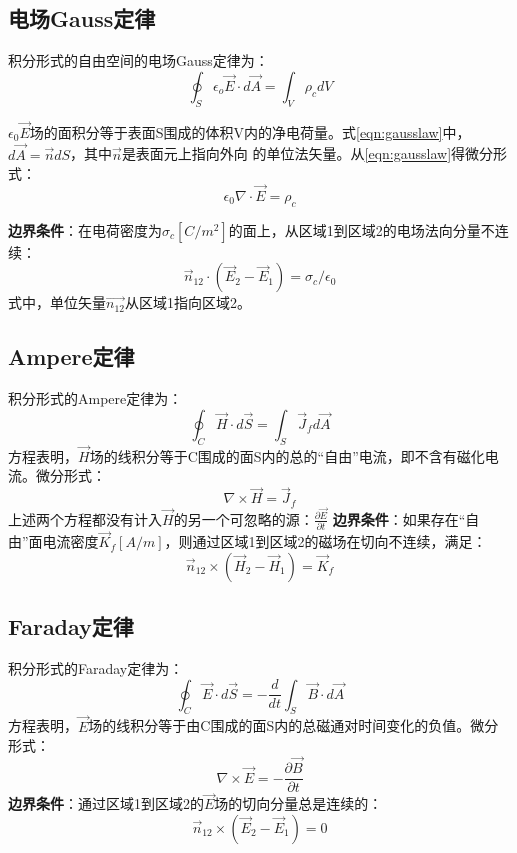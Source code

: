 \subsection{电场Gauss定律}
积分形式的自由空间的电场Gauss定律为：
\begin{equation}\label{eqn:gausslaw}
\oint_S \epsilon_o\vec{E}\cdot d\vec{A}=\int_V\rho_c dV
\end{equation}

$\epsilon_0\vec{E}$场的面积分等于表面S围成的体积V内的净电荷量。式\ref{eqn:gausslaw}中，$d\vec{A} =\vec{n}dS$，其中$\vec{n}$是表面元上指向外向
的单位法矢量。从\ref{eqn:gausslaw}得微分形式：
\begin{equation}\label{eqn:gausslaw diff}
  \epsilon_0 \nabla \cdot \vec{E}=\rho_c
\end{equation}

\textbf{边界条件}：在电荷密度为$\sigma_c[C/m^2]$的面上，从区域1到区域2的电场法向分量不连续：
\begin{equation}\label{eqn:gauss bc}
  \vec{n}_{12}\cdot (\vec{E}_2-\vec{E}_1)=\sigma_c/\epsilon_0
\end{equation}
式中，单位矢量$\vec{n_{12}}$从区域1指向区域2。

\subsection{Ampere定律}
积分形式的Ampere定律为：
\begin{equation}\label{eqn:amperelaw}
\oint_C \vec{H}\cdot d\vec{S}=\int_S \vec{J}_f d\vec{A}
\end{equation}
方程表明，$\vec{H}$场的线积分等于C围成的面S内的总的“自由”电流，即不含有磁化电流。微分形式：
\begin{equation}\label{eqn:amperelaw diff}
   \nabla \times \vec{H}=\vec{J}_f
\end{equation}
上述两个方程都没有计入$\vec{H}$的另一个可忽略的源：$\frac{\partial{\vec{E}}}{\partial{t}}$
\textbf{边界条件}：如果存在“自由”面电流密度$\vec{K}_f[A/m]$，则通过区域1到区域2的磁场在切向不连续，满足：
\begin{equation}\label{eqn:ampere bc}
  \vec{n}_{12}\times (\vec{H}_2-\vec{H}_1)=\vec{K}_f
\end{equation}

\subsection{Faraday定律}
积分形式的Faraday定律为：
\begin{equation}\label{eqn:faradaylaw}
\oint_C \vec{E}\cdot d\vec{S}=-\frac{d}{dt}\int_S \vec{B}\cdot d\vec{A}
\end{equation}
方程表明，$\vec{E}$场的线积分等于由C围成的面S内的总磁通对时间变化的负值。微分形式：
\begin{equation}\label{eqn:faradaylaw diff}
   \nabla \times \vec{E}=-\frac{\partial{\vec{B}}}{\partial{t}}
\end{equation}
\textbf{边界条件}：通过区域1到区域2的$\vec{E}$场的切向分量总是连续的：
\begin{equation}\label{eqn:faraday bc}
  \vec{n}_{12}\times (\vec{E}_2-\vec{E}_1)=0
\end{equation}

